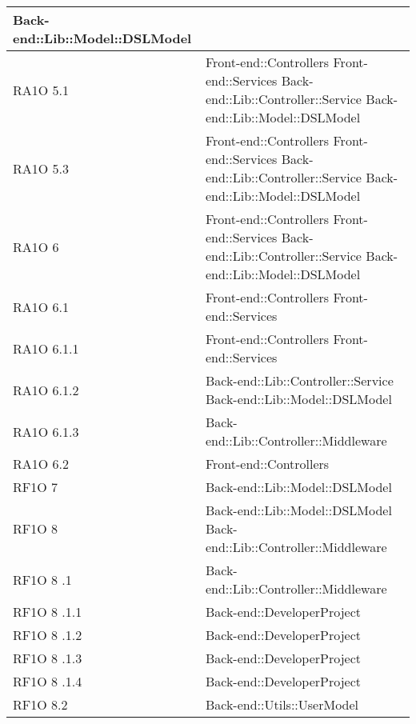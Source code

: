 \begin{center}
\begin{longtable}{|p{3cm}|p{7cm}|}
      			Back-end::Lib::Model::DSLModel \\ \hline
	  RA1O 5.1 & Front-end::Controllers \newline
	  			Front-end::Services \newline
	  			Back-end::Lib::Controller::Service\newline
	  			Back-end::Lib::Model::DSLModel \\ \hline
	  RA1O 5.3 & Front-end::Controllers \newline
	  			Front-end::Services \newline
	  			Back-end::Lib::Controller::Service\newline
	  			Back-end::Lib::Model::DSLModel \\ \hline
	  RA1O 6 & Front-end::Controllers \newline
	  			Front-end::Services \newline
	  			Back-end::Lib::Controller::Service\newline
	  			Back-end::Lib::Model::DSLModel \\ \hline
	  RA1O 6.1 & Front-end::Controllers \newline
	  			Front-end::Services \\ \hline
	  RA1O 6.1.1 & Front-end::Controllers \newline
	  			Front-end::Services \\ \hline
	  RA1O 6.1.2	 & Back-end::Lib::Controller::Service\newline
	  			Back-end::Lib::Model::DSLModel \\ \hline
	  RA1O 6.1.3 & Back-end::Lib::Controller::Middleware \\ \hline
	  RA1O 6.2 & Front-end::Controllers \\ \hline
      RF1O 7 & Back-end::Lib::Model::DSLModel \\ \hline
      RF1O 8	 & Back-end::Lib::Model::DSLModel \newline     
      			Back-end::Lib::Controller::Middleware \\ \hline
      RF1O 8	.1 & Back-end::Lib::Controller::Middleware \\ \hline
      RF1O 8	.1.1 & Back-end::DeveloperProject \\ \hline
      RF1O 8	.1.2 & Back-end::DeveloperProject \\ \hline
      RF1O 8	.1.3 & Back-end::DeveloperProject \\ \hline
      RF1O 8	.1.4 & Back-end::DeveloperProject \\ \hline
      RF1O 8.2 & Back-end::Utils::UserModel \\ \hline

\end{longtable}
\end{center}
